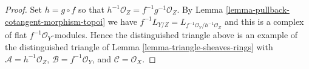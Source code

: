 \documentclass[10pt,a4paper]{amsart}
\theoremstyle{plain}
\theoremstyle{definition}
\theoremstyle{remark}
\numberwithin{equation}{subsection}
\begin{document}
\begin{proof}
Set $h = g \circ f$ so that $h^{-1}\mathcal{O}_Z = f^{-1}g^{-1}\mathcal{O}_Z$.
By Lemma \ref{lemma-pullback-cotangent-morphism-topoi} we have
$f^{-1}L_{Y/Z} = L_{f^{-1}\mathcal{O}_Y/h^{-1}\mathcal{O}_Z}$
and this is a complex of flat $f^{-1}\mathcal{O}_Y$-modules.
Hence the distinguished triangle above is an example of the
distinguished triangle of
Lemma \ref{lemma-triangle-sheaves-rings}
with $\mathcal{A} = h^{-1}\mathcal{O}_Z$, $\mathcal{B} = f^{-1}\mathcal{O}_Y$,
and $\mathcal{C} = \mathcal{O}_X$.
\end{proof}
\end{document}
